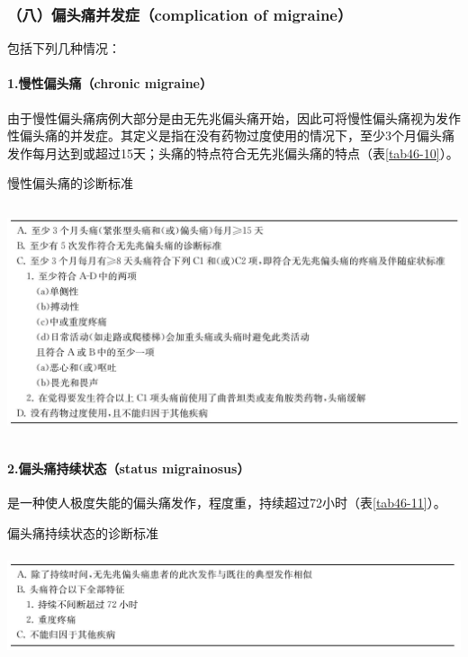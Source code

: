 \subsubsection{（八）偏头痛并发症（complication of migraine）}

包括下列几种情况：

\paragraph{1.慢性偏头痛（chronic migraine）}

由于慢性偏头痛病例大部分是由无先兆偏头痛开始，因此可将慢性偏头痛视为发作性偏头痛的并发症。其定义是指在没有药物过度使用的情况下，至少3个月偏头痛发作每月达到或超过15天；头痛的特点符合无先兆偏头痛的特点（表\ref{tab46-10}）。

\begin{table}[htbp]
\centering
\caption{慢性偏头痛的诊断标准}
\label{tab46-10}
\includegraphics[width=5.90625in,height=2.69792in]{./images/Image00286.jpg}
\end{table}

\paragraph{2.偏头痛持续状态（status migrainosus）}

是一种使人极度失能的偏头痛发作，程度重，持续超过72小时（表\ref{tab46-11}）。

\begin{table}[htbp]
\centering
\caption{偏头痛持续状态的诊断标准}
\label{tab46-11}
\includegraphics[width=5.94792in,height=1.16667in]{./images/Image00287.jpg}
\end{table}

